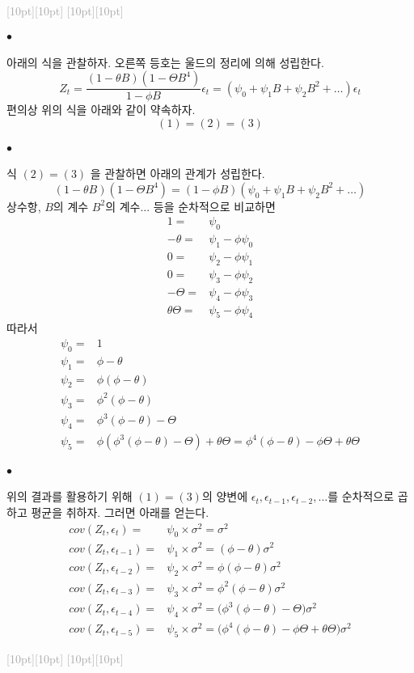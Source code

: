 \documentclass[12pt,oneside,english]{book}
\newcommand{\rdash}{\noindent \textcolor{darkgray}{ \raisebox{-1.9pt}[10pt][10pt]{\leafright} \hrulefill \raisebox{-1.9pt}[10pt][10pt]{\leafright \decofourleft \decothreeleft  \aldineright \decotwo \floweroneleft \decoone}}}
\def\ck{\paragraph{\Large$\bullet$}\Large}
\begin{document}
\rdash

\ck 아래의 식을 관찰하자. 오른쪽 등호는 울드의 정리에 의해 성립한다. 
\[
Z_t=\frac{(1-\theta B)(1-\Theta B^4)}{1-\phi B}\epsilon_t=(\psi_0+\psi_1 B+\psi_2 B^2 +\dots )\epsilon_{t}
\]
편의상 위의 식을 아래와 같이 약속하자. 
\[
(1)=(2)=(3)
\]

\ck 식 $(2)=(3)$ 을 관찰하면 아래의 관계가 성립한다. 
\[
(1-\theta B)(1-\Theta B^4)=(1-\phi B)(\psi_0+\psi_1 B+\psi_2 B^2+\dots)
\]
상수항, $B$의 계수 $B^2$의 계수... 등을 순차적으로 비교하면 
\begin{align*}
1=&\psi_0 \\ 
-\theta=&\psi_1-\phi\psi_0 \\ 
0=&\psi_2-\phi\psi_1 \\
0=&\psi_3-\phi\psi_2 \\
-\Theta=&\psi_4-\phi\psi_3 \\
\theta\Theta=&\psi_5-\phi\psi_4 
\end{align*}
따라서 
\begin{align*}
\psi_0=&1 \\
\psi_1=&\phi-\theta \\ 
\psi_2=&\phi(\phi-\theta) \\
\psi_3=&\phi^2(\phi-\theta) \\
\psi_4=&\phi^3(\phi-\theta)-\Theta \\
\psi_5=&\phi(\phi^3(\phi-\theta)-\Theta)+\theta\Theta=\phi^4(\phi-\theta)-\phi\Theta+\theta\Theta
\end{align*}

\ck 위의 결과를 활용하기 위해 $(1)=(3)$의 양변에 $\epsilon_t,\epsilon_{t-1},\epsilon_{t-2},\dots$를 순차적으로 곱하고 평균을 취하자. 그러면 아래를 얻는다. 
\begin{align*}
cov(Z_t,\epsilon_t)=&\psi_0 \times \sigma^2=\sigma^2 \\
cov(Z_t,\epsilon_{t-1})=&\psi_1\times \sigma^2=(\phi-\theta)\sigma^2 \\ 
cov(Z_t,\epsilon_{t-2})=&\psi_2\times \sigma^2=\phi(\phi-\theta) \sigma^2\\
cov(Z_t,\epsilon_{t-3})=&\psi_3\times \sigma^2=\phi^2(\phi-\theta)\sigma^2 \\
cov(Z_t,\epsilon_{t-4})=&\psi_4\times \sigma^2=\big(\phi^3(\phi-\theta)-\Theta\big)\sigma^2 \\
cov(Z_t,\epsilon_{t-5})=&\psi_5\times \sigma^2=\big(\phi^4(\phi-\theta)-\phi\Theta+\theta\Theta\big)\sigma^2
\end{align*}

\rdash 
\end{document}
